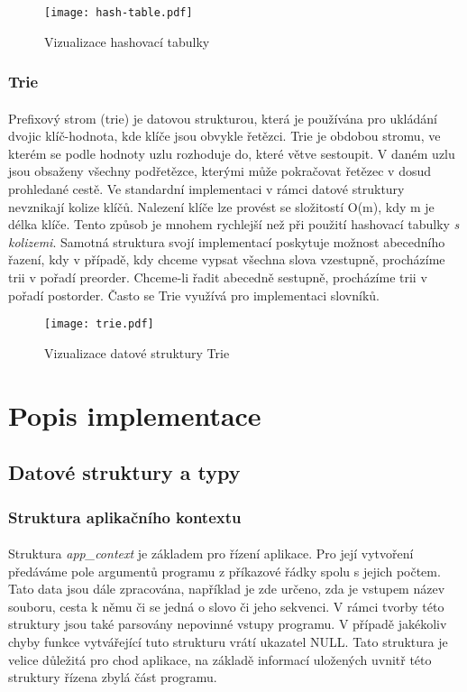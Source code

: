 ﻿\documentclass[12pt, a4paper]{article}
\begin{document}
\begin{figure}[H]
	\centering
	\texttt{[image: hash-table.pdf]}
	\caption{Vizualizace hashovací tabulky}
\end{figure}

\subsubsection{Trie}
\paragraph{}
Prefixový strom (trie) je datovou strukturou, která je používána pro ukládání dvojic klíč-hodnota, kde klíče jsou obvykle řetězci. Trie je obdobou stromu, ve kterém se podle hodnoty uzlu rozhoduje do, které větve sestoupit. V daném uzlu jsou obsaženy všechny podřetězce, kterými může pokračovat řetězec v dosud prohledané cestě. Ve standardní implementaci v rámci datové struktury nevznikají kolize klíčů. Nalezení klíče lze provést se složitostí O(m), kdy m je délka klíče. Tento způsob je mnohem rychlejší než při použití hashovací tabulky \textit{s kolizemi}. Samotná struktura svojí implementací poskytuje možnost abecedního řazení, kdy v případě, kdy chceme vypsat všechna slova vzestupně, procházíme trii v pořadí preorder. Chceme-li řadit abecedně sestupně, procházíme trii v pořadí postorder. Často se Trie využívá pro implementaci slovníků.  

\begin{figure}[H]
	\centering
	\texttt{[image: trie.pdf]}
	\caption{Vizualizace datové struktury Trie}
\end{figure}

\newpage
\section{Popis implementace}
\subsection{Datové struktury a typy}
\subsubsection{Struktura aplikačního kontextu}
\paragraph{}
Struktura \textit{app\_context} je základem pro řízení aplikace. Pro její vytvoření předáváme pole argumentů programu z příkazové řádky spolu s jejich počtem. Tato data jsou dále zpracována, například je zde určeno, zda je vstupem název souboru, cesta k němu či se jedná o slovo či jeho sekvenci. V rámci tvorby této struktury jsou také parsovány nepovinné vstupy programu. V případě jakékoliv chyby funkce vytvářející tuto strukturu vrátí ukazatel NULL. Tato struktura je velice důležitá pro chod aplikace, na základě informací uložených uvnitř této struktury řízena zbylá část programu. 
\end{document}
